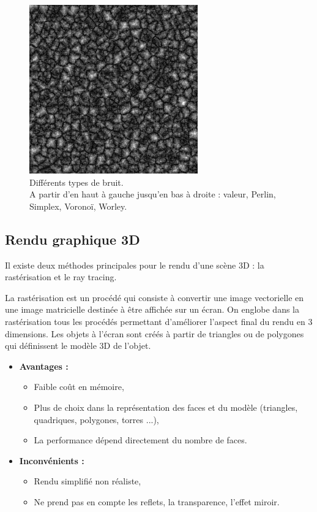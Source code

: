 \documentclass[a4paper]{article}
\begin{document}
\begin{figure}[!ht]
\begin{center}
     \end{center}
     \begin{center}
    \includegraphics[width=0.4\linewidth]{img/noise/worley.png}
    \end{center}
        \caption{\label{noises}Différents types de bruit\protect\footnotemark.\\
        A partir d'en haut à gauche jusqu'en bas à droite : valeur, Perlin, Simplex, Voronoï, Worley.}
    \end{figure}


\newpage
\subsection{Rendu graphique 3D} \label{raster/ray}

Il existe deux méthodes principales pour le rendu d'une scène 3D : la rastérisation et le ray tracing.

            La rastérisation est un procédé qui consiste à convertir une image vectorielle en une image matricielle destinée à être affichée sur un écran. On englobe dans la rastérisation tous les procédés permettant d'améliorer l'aspect final du rendu en 3 dimensions.
            Les objets à l'écran sont créés à partir de triangles ou de polygones qui définissent le modèle 3D de l'objet.
            \begin{itemize}
                \item \textbf{Avantages :}
                \begin{itemize}
                    \item Faible coût en mémoire,
                    \item Plus de choix dans la représentation des faces et du modèle (triangles, quadriques, polygones, torres ...),
                    \item La performance dépend directement du nombre de faces.
                \end{itemize}
                \item  \textbf{Inconvénients :}
                \begin{itemize}
                    \item Rendu simplifié non réaliste,
                    \item Ne prend pas en compte les reflets, la transparence, l'effet miroir.
                \end{itemize}
            \end{itemize}
        
\end{document}
